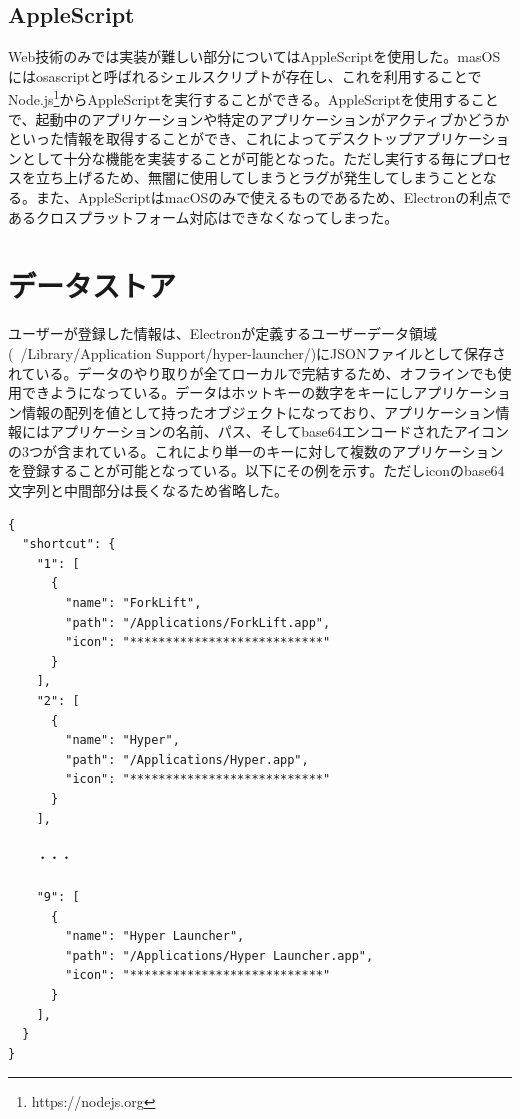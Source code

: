 \subsection{AppleScript}
Web技術のみでは実装が難しい部分についてはAppleScriptを使用した。masOSにはosascriptと呼ばれるシェルスクリプトが存在し、これを利用することでNode.js\footnote{https://nodejs.org}からAppleScriptを実行することができる。AppleScriptを使用することで、起動中のアプリケーションや特定のアプリケーションがアクティブかどうかといった情報を取得することができ、これによってデスクトップアプリケーションとして十分な機能を実装することが可能となった。ただし実行する毎にプロセスを立ち上げるため、無闇に使用してしまうとラグが発生してしまうこととなる。また、AppleScriptはmacOSのみで使えるものであるため、Electronの利点であるクロスプラットフォーム対応はできなくなってしまった。

\section{データストア}
ユーザーが登録した情報は、Electronが定義するユーザーデータ領域(~/Library/Application Support/hyper-launcher/)にJSONファイルとして保存されている。データのやり取りが全てローカルで完結するため、オフラインでも使用できようになっている。データはホットキーの数字をキーにしアプリケーション情報の配列を値として持ったオブジェクトになっており、アプリケーション情報にはアプリケーションの名前、パス、そしてbase64エンコードされたアイコンの3つが含まれている。これにより単一のキーに対して複数のアプリケーションを登録することが可能となっている。以下にその例を示す。ただしiconのbase64文字列と中間部分は長くなるため省略した。

\begin{lstlisting}[caption=config.json]
{
  "shortcut": {
    "1": [
      {
        "name": "ForkLift",
        "path": "/Applications/ForkLift.app",
        "icon": "***************************"
      }
    ],
    "2": [
      {
        "name": "Hyper",
        "path": "/Applications/Hyper.app",
        "icon": "***************************"
      }
    ],
    
    ・・・
    
    "9": [
      {
        "name": "Hyper Launcher",
        "path": "/Applications/Hyper Launcher.app",
        "icon": "***************************"
      }
    ],
  }
}
\end{lstlisting}